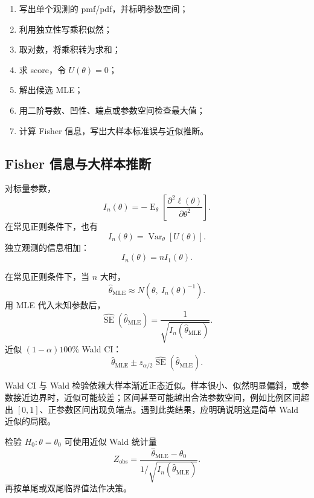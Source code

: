 \documentclass[11pt,a4paper]{article}
\newcommand{\E}{\operatorname{E}}
\newcommand{\Var}{\operatorname{Var}}
\newcommand{\SE}{\operatorname{SE}}
\newcommand{\1}{\mathbf{1}}
\begin{document}
\begin{methodbox}
\begin{enumerate}
  \item 写出单个观测的 pmf/pdf，并标明参数空间；
  \item 利用独立性写乘积似然；
  \item 取对数，将乘积转为求和；
  \item 求 score，令 $U(\theta)=0$；
  \item 解出候选 MLE；
  \item 用二阶导数、凹性、端点或参数空间检查最大值；
  \item 计算 Fisher 信息，写出大样本标准误与近似推断。
\end{enumerate}
\end{methodbox}

\subsection{Fisher 信息与大样本推断}

对标量参数，
\[
  \boxed{
  I_n(\theta)
  =
  -\E_\theta\left[
  \frac{\partial^2\ell(\theta)}{\partial\theta^2}
  \right].
  }
\]
在常见正则条件下，也有
\[
  I_n(\theta)=\Var_\theta[U(\theta)].
\]
独立观测的信息相加：
\[
  I_n(\theta)=nI_1(\theta).
\]

\begin{memorybox}
在常见正则条件下，当 $n$ 大时，
\[
  \boxed{
  \hat\theta_{\mathrm{MLE}}
  \approx
  N\left(\theta,\ I_n(\theta)^{-1}\right).
  }
\]
用 MLE 代入未知参数后，
\[
  \boxed{
  \widehat{\SE}(\hat\theta_{\mathrm{MLE}})
  =
  \frac{1}{\sqrt{I_n(\hat\theta_{\mathrm{MLE}})}}.
  }
\]
近似 $(1-\alpha)100\%$ Wald CI：
\[
  \boxed{
  \hat\theta_{\mathrm{MLE}}
  \pm
  z_{\alpha/2}
  \widehat{\SE}(\hat\theta_{\mathrm{MLE}}).
  }
\]
\end{memorybox}

\begin{warnbox}
Wald CI 与 Wald 检验依赖大样本渐近正态近似。样本很小、似然明显偏斜，或参数接近边界时，近似可能较差；区间甚至可能越出合法参数空间，例如比例区间超出 $[0,1]$、正参数区间出现负端点。遇到此类结果，应明确说明这是简单 Wald 近似的局限。
\end{warnbox}

检验 $H_0:\theta=\theta_0$ 可使用近似 Wald 统计量
\[
  \boxed{
  Z_{\mathrm{obs}}
  =
  \frac{\hat\theta_{\mathrm{MLE}}-\theta_0}
  {1/\sqrt{I_n(\hat\theta_{\mathrm{MLE}})}}.
  }
\]
再按单尾或双尾临界值法作决策。
\end{document}

